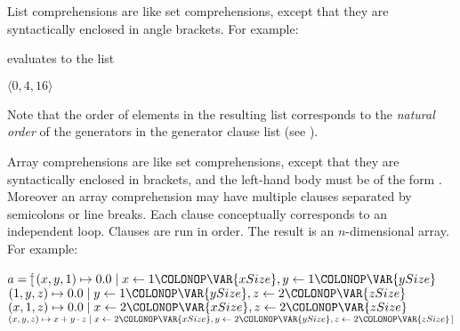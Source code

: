 List comprehensions are like set comprehensions,
except that they are syntactically enclosed in angle brackets.
For example:

evaluates to the list
\begin{Fortress}
\(\langle 0, 4, 16 \rangle\)
\end{Fortress}
Note that the order of elements in the resulting list corresponds to
the \emph{natural order} of the generators in the generator clause
list (see ).

Array comprehensions are like set comprehensions, except that they are
syntactically enclosed in brackets, and the left-hand body must be of
the form .  Moreover an array
comprehension may have multiple clauses separated by semicolons or
line breaks.  Each clause conceptually corresponds to an independent loop.
Clauses are run in order.  The result is an $n$-dimensional array.
For example:
\begin{Fortress}
\(a = [\null\)\pushtabs\=\+\((x,y,1) \mapsto 0.0   \mid x \gets 1\COLONOP\VAR{xSize}, y \gets 1\COLONOP\VAR{ySize}\)\\
\(      (1,y,z) \mapsto 0.0   \mid y \gets 1\COLONOP\VAR{ySize}, z \gets 2\COLONOP\VAR{zSize}\)\\
\(      (x,1,z) \mapsto 0.0   \mid x \gets 2\COLONOP\VAR{xSize}, z \gets 2\COLONOP\VAR{zSize}\)\\
\(      (x,y,z) \mapsto x+y\cdot z \mid x \gets 2\COLONOP\VAR{xSize}, y \gets 2\COLONOP\VAR{ySize}, z \gets 2\COLONOP\VAR{zSize}\,]\)\-\\\poptabs
\end{Fortress}
